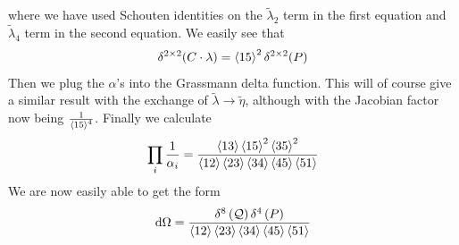 \documentclass[a4paper,12pt]{article}
\begin{document}
where we have used Schouten identities on the $\tilde\lambda_2$ term in the first equation and $\tilde \lambda_4$ term in the second equation. We easily see that
\begin{equation}
	\begin{aligned}
		\delta^{2\times 2}(C\cdot\lambda)=\expval{15}^2\delta^{2\times 2}(P)
	\end{aligned}
\end{equation}
Then we plug the $\alpha$'s into the Grassmann delta function. This will of course give a similar result with the exchange of $\tilde\lambda\to \tilde\eta$, although with the Jacobian factor now being $\frac{1}{\expval{15}^4}$. Finally we calculate
\begin{equation}
	\begin{aligned}
		\prod_i\frac{1}{\alpha_i}=\frac{\expval{13} \expval{15}^2 \expval{35}^2}{\expval{12}\expval{23}\expval{34}\expval{45}\expval{51}}
	\end{aligned}
\end{equation}
We are now easily able to get the form
\begin{equation}
	\begin{aligned}
		\dd \Omega =
		\frac{\delta^{8}\left(\mathcal{Q}\right)\delta^{4}\left(P\right)}{\expval{12}\expval{23}\expval{34}\expval{45}\expval{51}}
	\end{aligned}
\end{equation}
\end{document}
